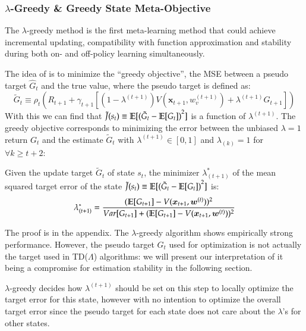 \documentclass{article}
\begin{document}
\subsubsection{$\lambda$-Greedy \& Greedy State Meta-Objective}
The $\lambda$-greedy method is the first meta-learning method that could achieve incremental updating, compatibility with function approximation and stability during both on- and off-policy learning simultaneously.%
\par
The idea of is to minimize the ``greedy objective'', \ie{} the MSE between a pseudo target $\hat{G}_t$ and the true value, where the pseudo target is defined as:
$$\tilde{G}_t \equiv \rho_t(R_{t+1} + \gamma_{t+1} [(1 - \lambda^{(t+1)})V(\bm{x}_{t+1}, w_v^{(t+1)}) + \lambda^{(t+1)} G_{t+1}])$$
With this we can find that $\tilde{J}(s_t) \equiv \mathbb{E}[{(\tilde{G}_t - \mathbb{E}[G_t])}^2]$ is a function of $\lambda^{(t+1)}$. The greedy objective corresponds to minimizing the error between the unbiased $\lambda = 1$ return $G_t$ and the estimate $\tilde{G}_t$ with $\lambda^{(t+1)} \in [0, 1]$ and $\lambda_{(k)} = 1$ for $\forall k \geq t + 2$:
\begin{proposition}\label{prop:greedy_minimizer}
Given the update target $\tilde{G}_t$ of state $s_t$, the minimizer $\lambda_{(t+1)}^*$ of the mean squared target error of the state 
$\tilde{J}(s_t) \equiv \mathbb{E}[{(\tilde{G}_t - \mathbb{E}[G_t])}^2]$ is:
\begin{equation}\label{eq:white_argmin}
\lambda_{(t+1)}^* = \frac{(\mathbb{E}[G_{t+1}] - V(\bm{x}_{t+1}, \bm{w}^{(t)}))^2}{Var[G_{t+1}] + (\mathbb{E}[G_{t+1}] - V(\bm{x}_{t+1}, \bm{w}^{(t)}))^2}
\end{equation}
\end{proposition}
The proof is in the appendix. The $\lambda$-greedy algorithm shows empirically strong performance. However, the pseudo target $\hat{G}_t$ used for optimization is not actually the target used in TD($\Lambda$) algorithms: we will present our interpretation of it being a compromise for estimation stability in the following section.
\par
$\lambda$-greedy decides how $\lambda^{(t+1)}$ should be set on this step to locally optimize the target error for this state, however with no intention to optimize the overall target error since the pseudo target for each state does not care about the $\lambda$'s for other states.
\end{document}
